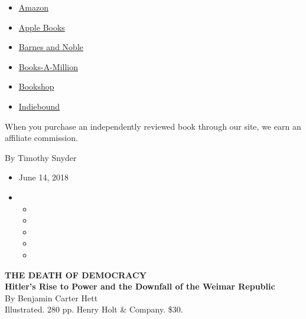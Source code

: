 \begin{itemize}
\tightlist
\item
  \href{https://www.amazon.com/gp/search?index=books\&tag=NYTBSREV-20\&field-keywords=The+Death+of+Democracy\%3A+Hitler\%E2\%80\%99s+Rise+to+Power+and+the+Downfall+of+the+Weimar+Republic+Benjamin+Carter+Hett}{Amazon}
\item
  \href{https://du-gae-books-dot-nyt-du-prd.appspot.com/buy?title=The+Death+of+Democracy\%3A+Hitler\%E2\%80\%99s+Rise+to+Power+and+the+Downfall+of+the+Weimar+Republic\&author=Benjamin+Carter+Hett}{Apple
  Books}
\item
  \href{https://www.anrdoezrs.net/click-7990613-11819508?url=https\%3A\%2F\%2Fwww.barnesandnoble.com\%2Fw\%2F\%3Fean\%3D9781250162502}{Barnes
  and Noble}
\item
  \href{https://www.anrdoezrs.net/click-7990613-35140?url=https\%3A\%2F\%2Fwww.booksamillion.com\%2Fp\%2FThe\%2BDeath\%2Bof\%2BDemocracy\%253A\%2BHitler\%25E2\%2580\%2599s\%2BRise\%2Bto\%2BPower\%2Band\%2Bthe\%2BDownfall\%2Bof\%2Bthe\%2BWeimar\%2BRepublic\%2FBenjamin\%2BCarter\%2BHett\%2F9781250162502}{Books-A-Million}
\item
  \href{https://bookshop.org/a/3546/9781250162502}{Bookshop}
\item
  \href{https://www.indiebound.org/book/9781250162502?aff=NYT}{Indiebound}
\end{itemize}

When you purchase an independently reviewed book through our site, we
earn an affiliate commission.

By Timothy Snyder

\begin{itemize}
\item
  June 14, 2018
\item
  \begin{itemize}
  \item
  \item
  \item
  \item
  \item
  \end{itemize}
\end{itemize}

\textbf{THE DEATH OF DEMOCRACY}\\
\textbf{Hitler's Rise to Power and the Downfall of the Weimar
Republic}\\
By Benjamin Carter Hett\\
Illustrated. 280 pp. Henry Holt \& Company. \$30.

